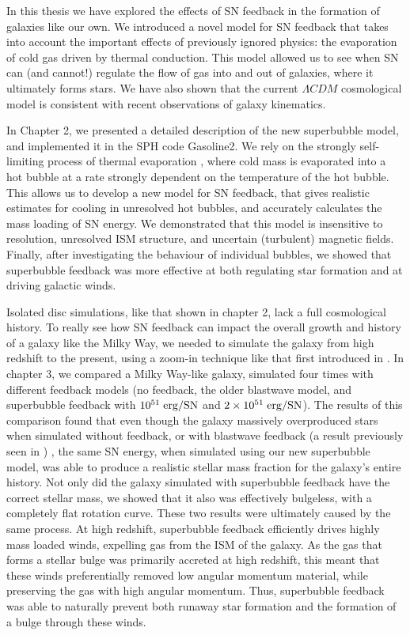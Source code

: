 In this thesis we have explored the effects of SN feedback in the formation of 
galaxies like our own.  We introduced a novel model for SN feedback that
takes into account the important effects of previously ignored physics: the
evaporation of cold gas driven by thermal conduction.  This model allowed us to
see when SN can (and cannot!) regulate the flow of gas into and out of galaxies,
where it ultimately forms stars.  We have also shown that the current $\Lambda
CDM$ cosmological model is consistent with recent observations of galaxy
kinematics.

In Chapter 2, we presented a detailed description of the new superbubble model,
and implemented it in the SPH code {\sc Gasoline2}.  We rely on the strongly
self-limiting process of thermal evaporation \citep{Cowie1977}, where cold mass
is evaporated into a hot bubble at a rate strongly dependent on the temperature
of the hot bubble. This allows us to develop a new model for SN feedback, that gives
realistic estimates for cooling in unresolved hot bubbles, and accurately
calculates the mass loading of SN energy.  We demonstrated that this model is
insensitive to resolution, unresolved ISM structure, and uncertain (turbulent)
magnetic fields.  Finally, after investigating the behaviour of individual
bubbles, we showed that superbubble feedback was more effective at both
regulating star formation and at driving galactic winds.

Isolated disc simulations, like that shown in chapter 2, lack a full
cosmological history.  To really see how SN feedback can impact the overall
growth and history of a galaxy like the Milky Way, we needed to simulate the
galaxy from high redshift to the present, using a zoom-in technique like that
first introduced in \citet{Navarro1993}.  In chapter 3, we compared a Milky
Way-like galaxy, simulated four times with different feedback models (no
feedback, the older \citet{Stinson2006} blastwave model, and superbubble
feedback with $10^{51}\;\rm{erg}/SN$ and $2\times10^{51}\;\rm{erg}/SN$).  The
results of this comparison found that even though the galaxy massively
overproduced stars when simulated without feedback, or with blastwave feedback
(a result previously seen in \citealt{Stinson2010}) , the same SN energy, when
simulated using our new superbubble model, was able to produce a realistic
stellar mass fraction for the galaxy's entire history.  Not only did the galaxy
simulated with superbubble feedback have the correct stellar mass, we showed
that it also was effectively bulgeless, with a completely flat rotation curve.
These two results were ultimately caused by the same process.  At high redshift,
superbubble feedback efficiently drives highly mass loaded winds, expelling gas
from the ISM of the galaxy.  As the gas that forms a stellar bulge was primarily
accreted at high redshift, this meant that these winds preferentially removed
low angular momentum material, while preserving the gas with high angular
momentum.  Thus, superbubble feedback was able to naturally prevent both runaway
star formation and the formation of a bulge through these winds.


